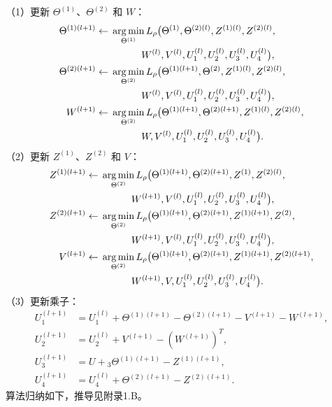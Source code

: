 \noindent（1）更新 $\Theta^{(1)}$、$\Theta^{(2)}$ 和 $W$：
\[
\begin{aligned}
\Theta^{(1)(l+1)}\leftarrow{}&\operatorname*{arg\,min}_{\Theta^{(1)}}L_\rho\bigl(\Theta^{(1)},\Theta^{(2)(l)},Z^{(1)(l)},Z^{(2)(l)},\\
&\hspace{3.1em}W^{(l)},V^{(l)},U_1^{(l)},U_2^{(l)},U_3^{(l)},U_4^{(l)}\bigr),\\
\Theta^{(2)(l+1)}\leftarrow{}&\operatorname*{arg\,min}_{\Theta^{(2)}}L_\rho\bigl(\Theta^{(1)(l+1)},\Theta^{(2)},Z^{(1)(l)},Z^{(2)(l)},\\
&\hspace{3.1em}W^{(l)},V^{(l)},U_1^{(l)},U_2^{(l)},U_3^{(l)},U_4^{(l)}\bigr),\\
W^{(l+1)}\leftarrow{}&\operatorname*{arg\,min}_{\Theta^{(2)}}L_\rho\bigl(\Theta^{(1)(l+1)},\Theta^{(2)(l+1)},Z^{(1)(l)},Z^{(2)(l)},\\
&\hspace{3.1em}W,V^{(l)},U_1^{(l)},U_2^{(l)},U_3^{(l)},U_4^{(l)}\bigr).
\end{aligned}
\]
\noindent（2）更新 $Z^{(1)}$、$Z^{(2)}$ 和 $V$：
\[
\begin{aligned}
Z^{(1)(l+1)}\leftarrow{}&\operatorname*{arg\,min}_{\Theta^{(2)}}L_\rho\bigl(\Theta^{(1)(l+1)},\Theta^{(2)(l+1)},Z^{(1)},Z^{(2)(l)},\\
&\hspace{3.1em}W^{(l+1)},V^{(l)},U_1^{(l)},U_2^{(l)},U_3^{(l)},U_4^{(l)}\bigr),\\
Z^{(2)(l+1)}\leftarrow{}&\operatorname*{arg\,min}_{\Theta^{(2)}}L_\rho\bigl(\Theta^{(1)(l+1)},\Theta^{(2)(l+1)},Z^{(1)(l+1)},Z^{(2)},\\
&\hspace{3.1em}W^{(l+1)},V^{(l)},U_1^{(l)},U_2^{(l)},U_3^{(l)},U_4^{(l)}\bigr),\\
V^{(l+1)}\leftarrow{}&\operatorname*{arg\,min}_{\Theta^{(2)}}L_\rho\bigl(\Theta^{(1)(l+1)},\Theta^{(2)(l+1)},Z^{(1)(l+1)},Z^{(2)(l+1)},\\
&\hspace{3.1em}W^{(l+1)},V,U_1^{(l)},U_2^{(l)},U_3^{(l)},U_4^{(l)}\bigr).
\end{aligned}
\]
\noindent（3）更新乘子：
\[
\begin{aligned}
U_1^{(l+1)}&=U_1^{(l)}+\Theta^{(1)(l+1)}-\Theta^{(2)(l+1)}-V^{(l+1)}-W^{(l+1)},\\
U_2^{(l+1)}&=U_2^{(l)}+V^{(l+1)}-(W^{(l+1)})^T,\\
U_3^{(l+1)}&=U+{}_3\Theta^{(1)(l+1)}-Z^{(1)(l+1)},\\
U_4^{(l+1)}&=U_4^{(l)}+\Theta^{(2)(l+1)}-Z^{(2)(l+1)}.
\end{aligned}
\]
算法归纳如下，推导见附录1.B。

